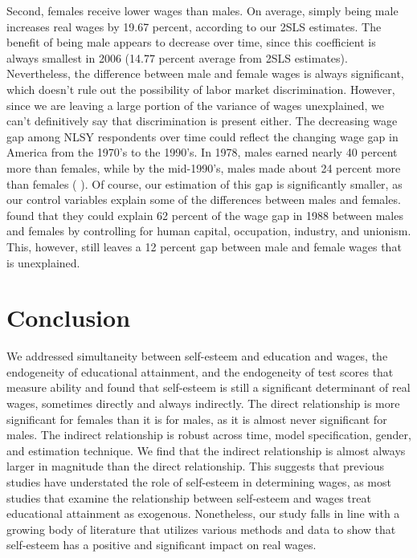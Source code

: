 \documentclass[12pt]{report}
\newcommand{\citee}[1]{\citename{#1} \citeyear{#1}}
\begin{document}
Second, females receive lower wages than males. On average, simply being male increases real wages by 19.67 percent, according to our 2SLS estimates. The benefit of being male appears to decrease over time, since this coefficient is always smallest in 2006 (14.77 percent average from 2SLS estimates). Nevertheless, the difference between male and female wages is always significant, which doesn't rule out the possibility of labor market discrimination. However, since we are leaving a large portion of the variance of wages unexplained, we can't definitively say that discrimination is present either. The decreasing wage gap among NLSY respondents over time could reflect the changing wage gap in America from the 1970's to the 1990's. In 1978, males earned nearly 40 percent more than females, while by the mid-1990's, males made about 24 percent more than females (\citee{BK2000}). Of course, our estimation of this gap is significantly smaller, as our control variables explain some of the differences between males and females. \citee{BK1997} found that they could explain 62 percent of the wage gap in 1988 between males and females by controlling for human capital, occupation, industry, and unionism. This, however, still leaves a 12 percent gap between male and female wages that is unexplained.


\chapter{Conclusion}

We addressed simultaneity between self-esteem and education and wages, the endogeneity of educational attainment, and the endogeneity of test scores that measure ability and found that self-esteem is still a significant determinant of real wages, sometimes directly and always indirectly. The direct relationship is more significant for females than it is for males, as it is almost never significant for males. The indirect relationship is robust across time, model specification, gender, and estimation technique. We find that the indirect relationship is almost always larger in magnitude than the direct relationship. This suggests that previous studies have understated the role of self-esteem in determining wages, as most studies that examine the relationship between self-esteem and wages treat educational attainment as exogenous. Nonetheless, our study falls in line with a growing body of literature that utilizes various methods and data to show that self-esteem has a positive and significant impact on real wages.
\end{document}
